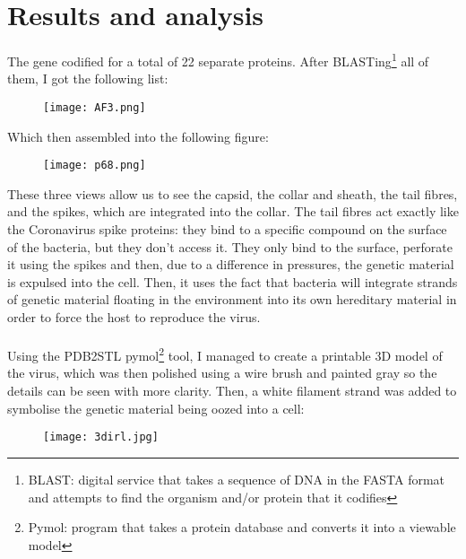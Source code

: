 \section{Results and analysis}
The gene codified for a total of 22 separate proteins. After BLASTing\footnote{BLAST: digital service that takes a sequence of DNA in the FASTA format and attempts to find the organism and/or protein that it codifies} all of them, I got the following list:
\begin{center}\begin{figure}[H]\centering\texttt{[image: AF3.png]}\end{figure}\end{center}
Which then assembled into the following figure:
\begin{center}\begin{figure}[H]\centering\texttt{[image: p68.png]}\end{figure}\end{center}
These three views allow us to see the capsid, the collar and sheath, the tail fibres, and the spikes, which are integrated into the collar. The tail fibres act exactly like the Coronavirus spike proteins: they bind to a specific compound on the surface of the bacteria, but they don't access it. They only bind to the surface, perforate it using the spikes and then, due to a difference in pressures, the genetic material is expulsed into the cell. Then, it uses the fact that bacteria will integrate strands of genetic material floating in the environment into its own hereditary material in order to force the host to reproduce the virus.
\paragraph{}Using the PDB2STL pymol\footnote{Pymol: program that takes a protein database and converts it into a viewable model} tool, I managed to create a printable 3D model of the virus, which was then polished using a wire brush and painted gray so the details can be seen with more clarity. Then, a white filament strand was added to symbolise the genetic material being oozed into a cell:
\begin{center}\begin{figure}[H]\centering\texttt{[image: 3dirl.jpg]}\end{figure}\end{center}